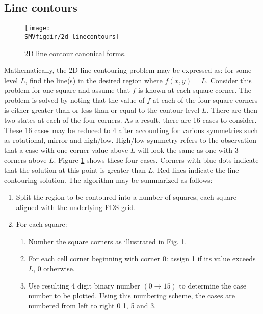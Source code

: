 \documentclass[11pt,twoside]{book}
\begin{document}
\subsection{Line contours}
\begin{figure}[bph]
\begin{center}
\texttt{[image: \\SMVfigdir/2d\_linecontours]}
\end{center}
\caption{2D line contour canonical forms.
  }
\label{fig2dline}%
\end{figure}
Mathematically, the 2D line contouring problem may be expressed
as: for some level $L$, find the line(s) in the desired region
where $f(x,y)=L$.  Consider this problem for one square and assume
that $f$ is known at each square corner.  The problem is solved by
noting that the value of $f$ at each of the four square corners is
either greater than or less than or equal to the contour level
$L$.  There are then two states at each of the four corners.  As a
result, there are 16 cases to consider.  These 16 cases may be
reduced to 4 after accounting for various symmetries such as
rotational, mirror and high/low.  High/low symmetry refers to the
observation that a case with one corner value above $L$ will look
the same as one with 3 corners above $L$. Figure \ref{fig2dline}
shows these four cases.  Corners with blue dots indicate that the
solution at this point is greater than $L$.  Red lines indicate
the line contouring solution.  The algorithm may be summarized as
follows:
\begin{enumerate}
\item Split the region to be contoured into a number of squares,
each square aligned with the underlying FDS grid.

\item For  each square:
\begin{enumerate}
\item Number the square corners as illustrated in Fig.
\ref{fig2dline}.

\item For each cell corner beginning with corner 0: assign 1 if
its value exceeds $L$, 0 otherwise.

\item Use resulting 4 digit binary number $(0\rightarrow 15)$ to
determine the case number to be plotted.  Using this numbering
scheme, the cases are numbered from left to right 0 1, 5 and 3.
\end{enumerate}
\end{enumerate}
\end{document}
